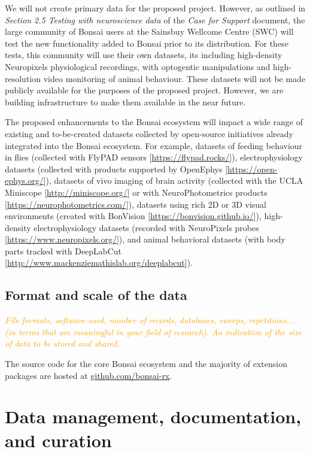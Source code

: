 \documentclass[a4paper,11pt]{article}
\renewcommand{\footnote}[1]{ [#1]}
\begin{document}
We will not create primary data for the proposed project. However, as outlined
in \emph{Section 2.5 Testing with neuroscience data} of the \emph{Case for
Support} document, the large community of Bonsai users at the Sainsbuy Wellcome
Centre (SWC) will test the new functionality added to Bonsai prior to its
distribution. For these tests, this community will use their own datasets, its
including high-density Neuropixels physiological recordings, with optogentic
manipulations and high-resolution video monitoring of animal behaviour. These
datasets will not be made publicly available for the purposes of the proposed
project. However, we are building infrastructure to make them available in the
near future.

The proposed enhancements to the Bonsai ecosystem will impact a wide range of
existing and to-be-created datasets collected by open-source initiatives
already integrated into the Bonsai ecosystem. For example, datasets of feeding
behaviour in flies (collected with FlyPAD
sensors\footnote{\url{https://flypad.rocks/}}), electrophysiology datasets
(collected with products supported by
OpenEphys\footnote{\url{https://open-ephys.org/}}), datasets of vivo imaging of
brain activity (collected with the UCLA
Miniscope\footnote{\url{http://miniscope.org/}} or with NeuroPhotometrics
products\footnote{\url{https://neurophotometrics.com/}}), datasets using rich
2D or 3D visual environments (created with
BonVision\footnote{\url{https://bonvision.github.io/}}), high-density
electrophysiology datasets (recorded with NeuroPixels
probes\footnote{\url{https://www.neuropixels.org/}}), and animal behavioral
datasets (with body parts tracked with
DeepLabCut\footnote{\url{http://www.mackenziemathislab.org/deeplabcut}}).

\subsection{Format and scale of the data}

\textcolor{orange}{\textit{File formats, software used, number of records, databases, sweeps, repetitions... (in terms that are meaningful in your field of research). An indication of the size of data to be stored and shared.}}

The source code for the core Bonsai ecosystem and the majority of extension
packages are hosted at \url{github.com/bonsai-rx}.

\section{Data management, documentation, and curation}
\end{document}
